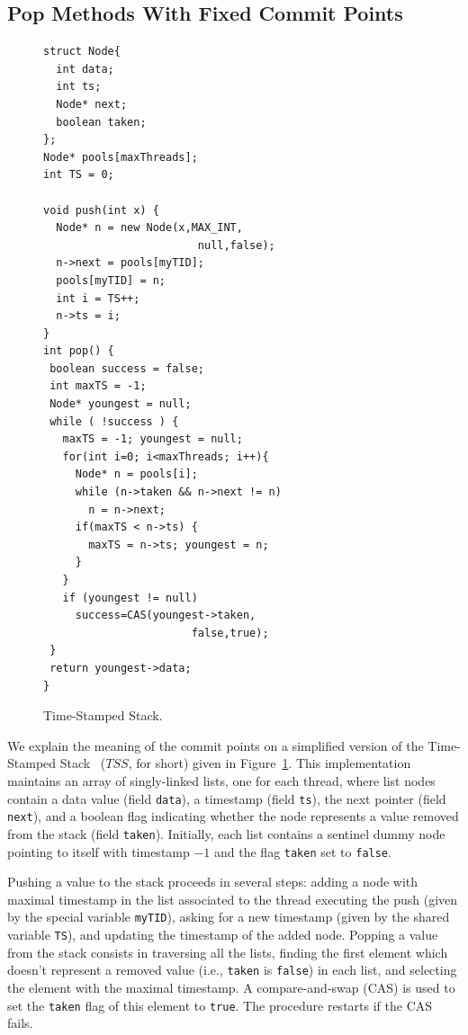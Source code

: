 \subsection{Pop Methods With Fixed Commit Points}
\vspace{-1mm}
\begin{figure}
\vspace{-10.5mm}
\begin{lstlisting}
struct Node{
  int data;
  int ts;
  Node* next;
  boolean taken;
};
Node* pools[maxThreads];
int TS = 0;   

void push(int x) {
  Node* n = new Node(x,MAX_INT,
                        null,false);
  n->next = pools[myTID];
  pools[myTID] = n;
  int i = TS++;
  n->ts = i;
}
int pop() {
 boolean success = false;
 int maxTS = -1;
 Node* youngest = null;
 while ( !success ) {
   maxTS = -1; youngest = null;
   for(int i=0; i<maxThreads; i++){
     Node* n = pools[i];
     while (n->taken && n->next != n)
       n = n->next;
     if(maxTS < n->ts) {
       maxTS = n->ts; youngest = n;
     }
   }
   if (youngest != null)
     success=CAS(youngest->taken,
                       false,true);
 }
 return youngest->data;
}
\end{lstlisting}
\vspace{-6mm}
\caption{Time-Stamped Stack.} %
\label{fig:TimeStamped}
\vspace{-7mm}
\end{figure}
We explain the meaning of the commit points on a simplified version of the Time-Stamped Stack~\cite{DBLP:conf/popl/DoddsHK15} ($\mathit{TSS}$, for short) given in Figure~\ref{fig:TimeStamped}. This  implementation maintains an array of singly-linked lists, one for each thread, where list nodes contain a data value (field {\tt data}), a timestamp (field {\tt ts}), the next pointer (field {\tt next}), and a boolean flag indicating whether the node represents a value removed from the stack (field {\tt taken}). Initially, each list contains a sentinel dummy node pointing to itself with timestamp $-1$ and the flag {\tt taken} set to {\tt false}.

Pushing a value to the stack proceeds in several steps: adding a node with maximal timestamp in the list associated to the thread executing the push (given by the special variable {\tt myTID}), asking for a new timestamp (given by the shared variable {\tt TS}), and updating the timestamp of the added node. Popping a value from the stack consists in traversing all the lists, finding the first element which doesn't represent a removed value (i.e., {\tt taken} is {\tt false}) in each list, and selecting the element with the maximal timestamp. A compare-and-swap (CAS) is used to set the {\tt taken} flag of this element to {\tt true}. The procedure restarts if the CAS fails.

